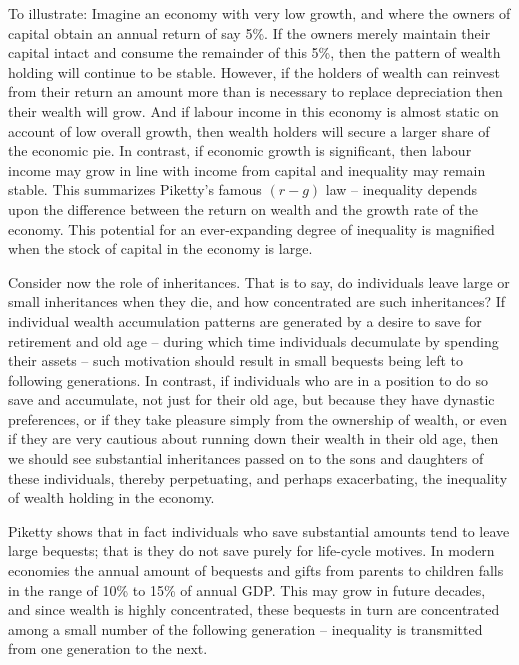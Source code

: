 To illustrate: Imagine an economy with very low growth, and where the owners
of capital obtain an annual return of say 5\%. If the owners merely maintain
their capital intact and consume the remainder of this 5\%, then the pattern
of wealth holding will continue to be stable. However, if the holders of
wealth can reinvest from their return an amount more than is necessary to
replace depreciation then their wealth will grow. And if labour income in
this economy is almost static on account of low overall growth, then wealth
holders will secure a larger share of the economic pie. In contrast, if
economic growth is significant, then labour income may grow in line with
income from capital and inequality may remain stable. This summarizes
Piketty's famous $(r-g)$ law -- inequality depends upon the difference
between the return on wealth and the growth rate of the economy. This
potential for an ever-expanding degree of inequality is magnified when the
stock of capital in the economy is large.

Consider now the role of inheritances. That is to say, do individuals leave
large or small inheritances when they die, and how concentrated are such
inheritances? If individual wealth accumulation patterns are generated by a
desire to save for retirement and old age -- during which time individuals
decumulate by spending their assets -- such motivation should result in small
bequests being left to following generations. In contrast, if individuals
who are in a position to do so save and accumulate, not just for their old
age, but because they have dynastic preferences, or if they take pleasure
simply from the ownership of wealth, or even if they are very cautious about
running down their wealth in their old age, then we should see
substantial inheritances passed on to the sons and daughters of these
individuals, thereby perpetuating, and perhaps exacerbating, the inequality
of wealth holding in the economy.

Piketty shows that in fact individuals who save substantial amounts tend to
leave large bequests; that is they do not save purely for life-cycle
motives. In modern economies the annual amount of bequests and gifts from
parents to children falls in the range of 10\% to 15\% of annual GDP. This
may grow in future decades, and since wealth is highly concentrated, these
bequests in turn are concentrated among a small number of the following
generation -- inequality is transmitted from one generation to the next.

\newhtmlpage

